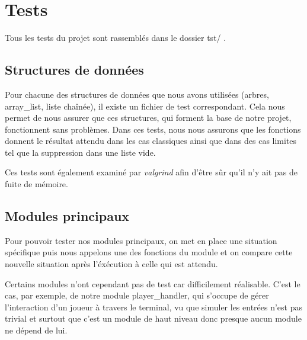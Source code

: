 \section{Tests}

Tous les tests du projet sont rassemblés dans le dossier tst/ . 

\subsection{Structures de données}
Pour chacune des structures de données que nous avons utilisées (arbres, array\_list, liste chaînée),
il existe un fichier de test correspondant. Cela nous permet de nous assurer que ces structures, qui
forment la base de notre projet, fonctionnent sans problèmes. Dans ces tests, nous nous assurons que les fonctions
donnent le résultat attendu dans les cas classiques ainsi que dans des cas limites tel que la suppression 
dans une liste vide. 

Ces tests sont également examiné par \emph{valgrind} afin d'être sûr qu'il n'y ait pas 
de fuite de mémoire.

\subsection{Modules principaux}
Pour pouvoir tester nos modules principaux, on met en place une situation spécifique puis nous appelons une des 
fonctions du module et on compare cette nouvelle situation après l'éxécution à celle qui est attendu.

Certains modules n'ont cependant pas de test car difficilement réalisable. C'est le cas, par exemple, de notre
module player\_handler, qui s'occupe de gérer l'interaction d'un joueur à travers le terminal, vu que simuler
les entrées n'est pas trivial et surtout que c'est un module de haut niveau donc presque aucun module ne dépend de lui.

